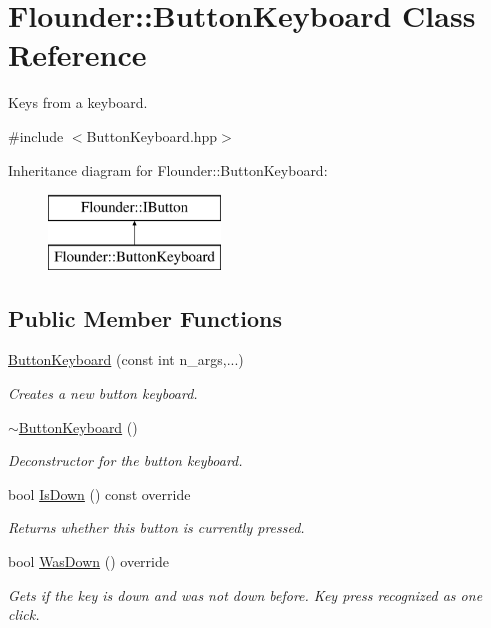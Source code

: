 \hypertarget{class_flounder_1_1_button_keyboard}{}\section{Flounder\+:\+:Button\+Keyboard Class Reference}
\label{class_flounder_1_1_button_keyboard}


Keys from a keyboard.  




{\ttfamily \#include $<$Button\+Keyboard.\+hpp$>$}

Inheritance diagram for Flounder\+:\+:Button\+Keyboard\+:\begin{figure}[H]
\begin{center}
\leavevmode
\includegraphics[height=2.000000cm]{class_flounder_1_1_button_keyboard}
\end{center}
\end{figure}
\subsection*{Public Member Functions}
\begin{DoxyCompactItemize}
\item 
\hyperlink{class_flounder_1_1_button_keyboard_af280179504f2ac8f83821ac24161635a}{Button\+Keyboard} (const int n\+\_\+args,...)
\begin{DoxyCompactList}\small\item\em Creates a new button keyboard. \end{DoxyCompactList}\item 
\hyperlink{class_flounder_1_1_button_keyboard_a5eca7c902d0e48d06909caa8185f51b7}{$\sim$\+Button\+Keyboard} ()
\begin{DoxyCompactList}\small\item\em Deconstructor for the button keyboard. \end{DoxyCompactList}\item 
bool \hyperlink{class_flounder_1_1_button_keyboard_aa90e1ba336eea1bf4cecd4ed7def7a02}{Is\+Down} () const override
\begin{DoxyCompactList}\small\item\em Returns whether this button is currently pressed. \end{DoxyCompactList}\item 
bool \hyperlink{class_flounder_1_1_button_keyboard_a67f15c721a2e7afdf6594c6912a8e664}{Was\+Down} () override
\begin{DoxyCompactList}\small\item\em Gets if the key is down and was not down before. Key press recognized as one click. \end{DoxyCompactList}\end{DoxyCompactItemize}
